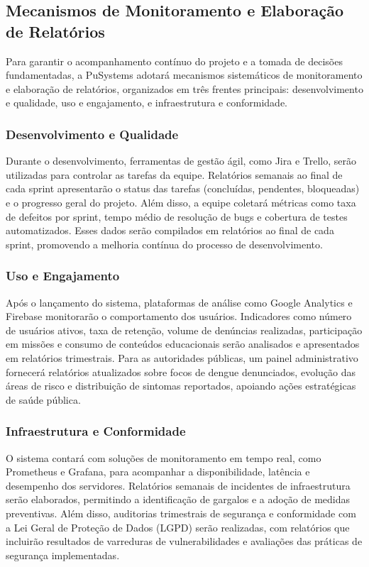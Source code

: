 \documentclass[a5paper, 12pt]{article}
\begin{document}
\subsection{Mecanismos de Monitoramento e Elaboração de Relatórios}

Para garantir o acompanhamento contínuo do projeto e a tomada de decisões fundamentadas, a PuSystems adotará mecanismos sistemáticos de monitoramento e elaboração de relatórios, organizados em três frentes principais: desenvolvimento e qualidade, uso e engajamento, e infraestrutura e conformidade.

\subsubsection{Desenvolvimento e Qualidade}

Durante o desenvolvimento, ferramentas de gestão ágil, como Jira e Trello, serão utilizadas para controlar as tarefas da equipe. Relatórios semanais ao final de cada sprint apresentarão o status das tarefas (concluídas, pendentes, bloqueadas) e o progresso geral do projeto. Além disso, a equipe coletará métricas como taxa de defeitos por sprint, tempo médio de resolução de bugs e cobertura de testes automatizados. Esses dados serão compilados em relatórios ao final de cada sprint, promovendo a melhoria contínua do processo de desenvolvimento.

\subsubsection{Uso e Engajamento}

Após o lançamento do sistema, plataformas de análise como Google Analytics e Firebase monitorarão o comportamento dos usuários. Indicadores como número de usuários ativos, taxa de retenção, volume de denúncias realizadas, participação em missões e consumo de conteúdos educacionais serão analisados e apresentados em relatórios trimestrais. Para as autoridades públicas, um painel administrativo fornecerá relatórios atualizados sobre focos de dengue denunciados, evolução das áreas de risco e distribuição de sintomas reportados, apoiando ações estratégicas de saúde pública.

\subsubsection{Infraestrutura e Conformidade}

O sistema contará com soluções de monitoramento em tempo real, como Prometheus e Grafana, para acompanhar a disponibilidade, latência e desempenho dos servidores. Relatórios semanais de incidentes de infraestrutura serão elaborados, permitindo a identificação de gargalos e a adoção de medidas preventivas. Além disso, auditorias trimestrais de segurança e conformidade com a Lei Geral de Proteção de Dados (LGPD) serão realizadas, com relatórios que incluirão resultados de varreduras de vulnerabilidades e avaliações das práticas de segurança implementadas.
\end{document}
